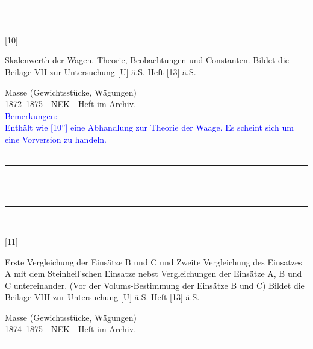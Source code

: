 \\
\vspace*{-2.5pt}\\
\parbox{\textwidth}{%
\rule{\textwidth}{1pt}\vspace*{-3mm}\\
\begin{minipage}[t]{0.15\textwidth}\vspace{0pt}
\Huge\rule[-4mm]{0cm}{1cm}[10]
\end{minipage}
\hfill
\begin{minipage}[t]{0.85\textwidth}\vspace{0pt}
\large Skalenwerth der Wagen. Theorie, Beobachtungen und Constanten. Bildet die Beilage VII zur Untersuchung [U] ä.S. Heft [13] ä.S.\rule[-2mm]{0mm}{2mm}
\end{minipage}
{\footnotesize\flushright
Masse (Gewichtsstücke, Wägungen)\\
}
1872--1875\quad---\quad NEK\quad---\quad Heft im Archiv.\\
\textcolor{blue}{Bemerkungen:\\{}
Enthält wie [10''] eine Abhandlung zur Theorie der Waage. Es scheint sich um eine Vorversion zu handeln.\\{}
}
\\[-15pt]
\rule{\textwidth}{1pt}
}
\\
\vspace*{-2.5pt}\\
\parbox{\textwidth}{%
\rule{\textwidth}{1pt}\vspace*{-3mm}\\
\begin{minipage}[t]{0.15\textwidth}\vspace{0pt}
\Huge\rule[-4mm]{0cm}{1cm}[11]
\end{minipage}
\hfill
\begin{minipage}[t]{0.85\textwidth}\vspace{0pt}
\large Erste Vergleichung der Einsätze B und C und Zweite Vergleichung des Einsatzes A mit dem Steinheil'schen Einsatze nebst Vergleichungen der Einsätze A, B und C untereinander. (Vor der Volums-Bestimmung der Einsätze B und C) Bildet die Beilage VIII zur Untersuchung [U] ä.S. Heft [13] ä.S.\rule[-2mm]{0mm}{2mm}
\end{minipage}
{\footnotesize\flushright
Masse (Gewichtsstücke, Wägungen)\\
}
1874--1875\quad---\quad NEK\quad---\quad Heft im Archiv.\\
\rule{\textwidth}{1pt}
}
